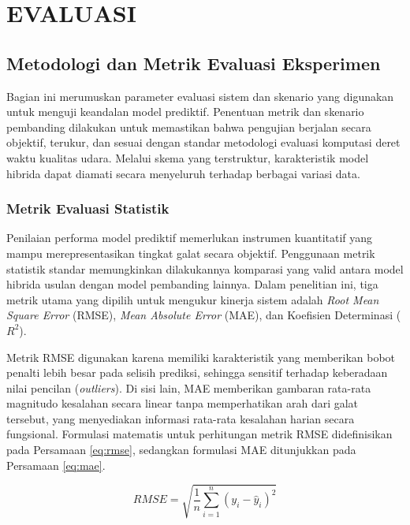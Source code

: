 \cleardoublepage
\chapter{EVALUASI}
\label{chap:evaluasi}

\section{Metodologi dan Metrik Evaluasi Eksperimen}

Bagian ini merumuskan parameter evaluasi sistem dan skenario yang digunakan untuk menguji keandalan model prediktif. Penentuan metrik dan skenario pembanding dilakukan untuk memastikan bahwa pengujian berjalan secara objektif, terukur, dan sesuai dengan standar metodologi evaluasi komputasi deret waktu kualitas udara. Melalui skema yang terstruktur, karakteristik model hibrida dapat diamati secara menyeluruh terhadap berbagai variasi data.

\subsection{Metrik Evaluasi Statistik}

Penilaian performa model prediktif memerlukan instrumen kuantitatif yang mampu merepresentasikan tingkat galat secara objektif. Penggunaan metrik statistik standar memungkinkan dilakukannya komparasi yang valid antara model hibrida usulan dengan model pembanding lainnya. Dalam penelitian ini, tiga metrik utama yang dipilih untuk mengukur kinerja sistem adalah \textit{Root Mean Square Error} (RMSE), \textit{Mean Absolute Error} (MAE), dan Koefisien Determinasi ($R^2$).

Metrik RMSE digunakan karena memiliki karakteristik yang memberikan bobot penalti lebih besar pada selisih prediksi, sehingga sensitif terhadap keberadaan nilai pencilan (\textit{outliers}). Di sisi lain, MAE memberikan gambaran rata-rata magnitudo kesalahan secara linear tanpa memperhatikan arah dari galat tersebut, yang menyediakan informasi rata-rata kesalahan harian secara fungsional. Formulasi matematis untuk perhitungan metrik RMSE didefinisikan pada Persamaan \ref{eq:rmse}, sedangkan formulasi MAE ditunjukkan pada Persamaan \ref{eq:mae}.

\begin{equation}
RMSE = \sqrt{\frac{1}{n} \sum_{i=1}^{n} (y_i - \hat{y}_i)^2}
\label{eq:rmse}
\end{equation}

